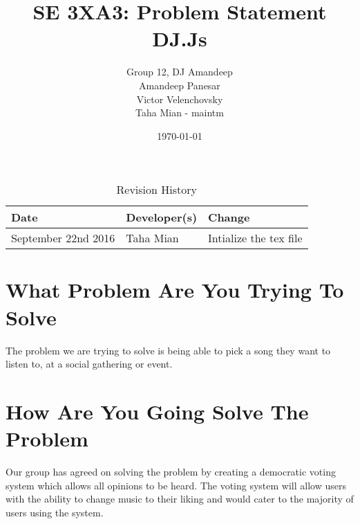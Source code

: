 \documentclass[11pt,fleqn]{article}
\title{SE 3XA3: Problem Statement\\DJ.Js}
\author{Group 12, DJ Amandeep\\
Amandeep Panesar \\ Victor Velenchovsky \\ Taha Mian - maintm}
\date{\today}
\begin{document}
\begin{table}[hp]
\caption{Revision History} \label{TblRevisionHistory}
\begin{tabularx}{\textwidth}{llX}
\toprule
\textbf{Date} & \textbf{Developer(s)} & \textbf{Change}\\
\midrule
September 22nd 2016 & Taha Mian & Intialize the tex file\\

\bottomrule
\end{tabularx}
\end{table}
\maketitle
\section{What Problem Are You Trying To Solve}
The problem we are trying to solve is being able to pick a song they want to listen to, at a social gathering or event.
\section{How Are You Going Solve The Problem}
Our group has agreed on solving the problem by creating a democratic voting system which allows all opinions to be heard. The voting system will allow users with the ability to change music to their liking and would cater to the majority of users using the system.  
\end{document}
